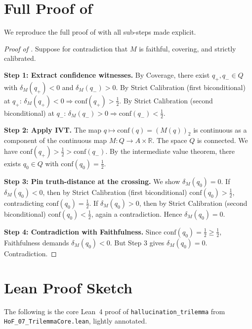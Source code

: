 \documentclass[10pt]{article}
\newcommand{\R}{\mathbb{R}}
\newcommand{\conf}{\mathrm{conf}}
\begin{document}



\appendix

\section{Full Proof of }
\label{app:proof}

We reproduce the full proof of  with all
sub-steps made explicit.

\begin{proof}[Proof of ]
Suppose for contradiction that $M$ is faithful, covering, and strictly
calibrated.

\textbf{Step 1: Extract confidence witnesses.}
By Coverage, there exist $q_+, q_- \in Q$ with
$\delta_M(q_+) < 0$ and $\delta_M(q_-) > 0$.
By Strict Calibration (first biconditional) at $q_+$:
$\delta_M(q_+) < 0 \Rightarrow \conf(q_+) > \tfrac{1}{2}$.
By Strict Calibration (second biconditional) at $q_-$:
$\delta_M(q_-) > 0 \Rightarrow \conf(q_-) < \tfrac{1}{2}$.

\textbf{Step 2: Apply IVT.}
The map $q \mapsto \conf(q) = (M(q))_2$ is continuous as a component of
the continuous map $M\colon Q \to A \times \R$. The space $Q$ is connected.
We have $\conf(q_+) > \tfrac{1}{2} > \conf(q_-)$.
By the intermediate value theorem, there exists $q_0 \in Q$ with
$\conf(q_0) = \tfrac{1}{2}$.

\textbf{Step 3: Pin truth-distance at the crossing.}
We show $\delta_M(q_0) = 0$. If $\delta_M(q_0) < 0$, then by Strict
Calibration (first biconditional) $\conf(q_0) > \tfrac{1}{2}$,
contradicting $\conf(q_0) = \tfrac{1}{2}$. If $\delta_M(q_0) > 0$,
then by Strict Calibration (second biconditional) $\conf(q_0) < \tfrac{1}{2}$,
again a contradiction. Hence $\delta_M(q_0) = 0$.

\textbf{Step 4: Contradiction with Faithfulness.}
Since $\conf(q_0) = \tfrac{1}{2} \geq \tfrac{1}{2}$, Faithfulness demands
$\delta_M(q_0) < 0$. But Step 3 gives $\delta_M(q_0) = 0$. Contradiction.
\end{proof}

\section{Lean Proof Sketch}
\label{app:lean}

The following is the core Lean~4 proof of \texttt{hallucination\_trilemma}
from \texttt{HoF\_07\_TrilemmaCore.lean}, lightly annotated.
\end{document}
